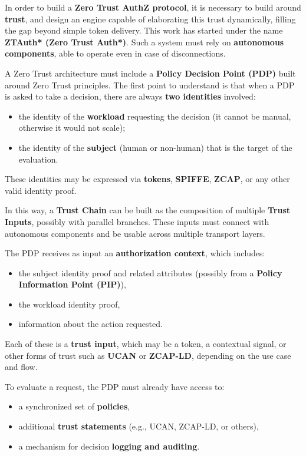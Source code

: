 In order to build a \textbf{Zero Trust AuthZ protocol}, it is necessary to build around \textbf{trust}, 
and design an engine capable of elaborating this trust dynamically, filling the gap beyond simple token delivery.  
This work has started under the name \textbf{ZTAuth* (Zero Trust Auth*)}.  
Such a system must rely on \textbf{autonomous components}, able to operate even in case of disconnections.  

\vspace{0.5em}  
A Zero Trust architecture must include a \textbf{Policy Decision Point (PDP)} built around Zero Trust principles.  
The first point to understand is that when a PDP is asked to take a decision, there are always \textbf{two identities} involved:
\begin{itemize}
    \item the identity of the \textbf{workload} requesting the decision (it cannot be manual, otherwise it would not scale);
    \item the identity of the \textbf{subject} (human or non-human) that is the target of the evaluation.
\end{itemize}
These identities may be expressed via \textbf{tokens}, \textbf{SPIFFE}, \textbf{ZCAP}, or any other valid identity proof.  

\vspace{0.5em}  
In this way, a \textbf{Trust Chain} can be built as the composition of multiple \textbf{Trust Inputs}, 
possibly with parallel branches. These inputs must connect with autonomous components 
and be usable across multiple transport layers.  

The PDP receives as input an \textbf{authorization context}, which includes:
\begin{itemize}
    \item the subject identity proof and related attributes (possibly from a \textbf{Policy Information Point (PIP)}),
    \item the workload identity proof,
    \item information about the action requested.
\end{itemize}
Each of these is a \textbf{trust input}, which may be a token, a contextual signal, or other forms of trust such as \textbf{UCAN} or \textbf{ZCAP-LD}, depending on the use case and flow.  

\vspace{0.5em}  
To evaluate a request, the PDP must already have access to:
\begin{itemize}
    \item a synchronized set of \textbf{policies},
    \item additional \textbf{trust statements} (e.g., UCAN, ZCAP-LD, or others),
    \item a mechanism for decision \textbf{logging and auditing}.
\end{itemize}

